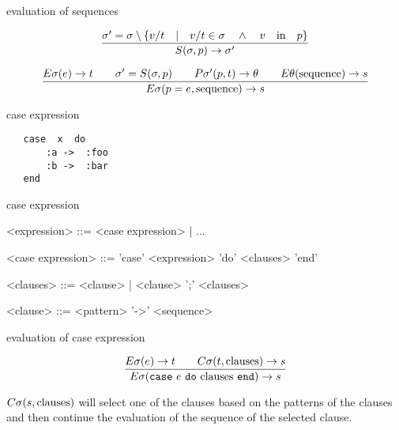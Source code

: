 \begin{frame}{evaluation of sequences}

$$\frac{\sigma' = \sigma \setminus \lbrace v/t \quad | \quad v/t \in \sigma \quad \wedge \quad  v \quad {\rm in} \quad p\rbrace}{S(\sigma, p) \rightarrow \sigma'}$$

\pause\vspace{20pt}


$$\frac{   
  E\sigma(e) \rightarrow t
  \qquad \sigma' = S(\sigma, p)
  \qquad P\sigma'(p, t) \rightarrow \theta
  \qquad E\theta({\rm sequence}) \rightarrow s
}{E\sigma(p = e, {\rm sequence}) \rightarrow s}$$ 


\pause\vspace{20pt}{\em First evaluate the pattern matching expression, if it succeeds then continue with the new environment.}
\end{frame}

\begin{frame}[fragile]{case expression}

\begin{verbatim}
   case  x  do
       :a ->  :foo
       :b ->  :bar
   end
\end{verbatim}

\end{frame}

\begin{frame}{case expression}

\begin{grammar}
     <expression> ::=  <case expression> | ...  

     <case expression> ::= 'case' <expression> 'do' <clauses>  'end' 

     <clauses> ::=   <clause> | <clause> ';' <clauses>

     <clause> ::=  <pattern> '->' <sequence>
\end{grammar}
\end{frame}

\begin{frame}{evaluation of case expression}


$$\frac{E\sigma(e) \rightarrow t \qquad C\sigma(t, {\rm clauses}) \rightarrow s }{E\sigma({\tt case}\ e \ {\tt do}\ {\rm clauses} \ {\tt end}) \rightarrow s}$$
  


 \vspace{20pt}\pause $C\sigma(s, {\rm clauses})$ will select one of
 the clauses based on the patterns of the clauses and then continue the
 evaluation of the sequence of the selected clause.
\end{frame}

